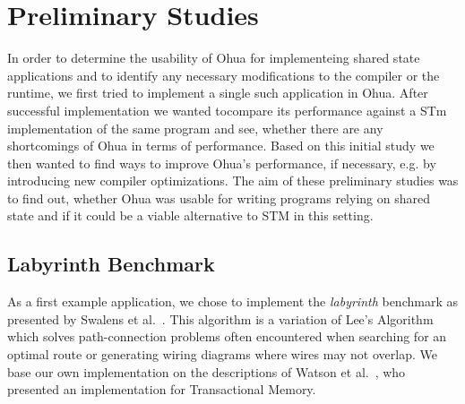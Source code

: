 %
\chapter{Preliminary Studies}
\label{sec:preliminary}

In order to determine the usability of Ohua for implementeing shared state applications and to identify any necessary modifications to the compiler or the runtime, we first tried to implement a single such application in Ohua.
After successful implementation we wanted tocompare its performance against a STm implementation of the same program and see, whether there are any shortcomings of Ohua in terms of performance.
Based on this initial study we then wanted to find ways to improve Ohua's performance, if necessary, e.g. by introducing new compiler optimizations.
The aim of these preliminary studies was to find out, whether Ohua was usable for writing programs relying on shared state and if it could be a viable alternative to STM in this setting.

\section{Labyrinth Benchmark}

As a first example application, we chose to implement the \emph{labyrinth} benchmark as presented by Swalens et al.~\cite{swalens2016transactional}.
This algorithm is a variation of Lee's Algorithm~\cite{lee1961algorithm} which solves path-connection problems often encountered when searching for an optimal route or generating wiring diagrams where wires may not overlap.
We base our own implementation on the descriptions of Watson et al.~\cite{watson2007study}, who presented an implementation for Transactional Memory.

